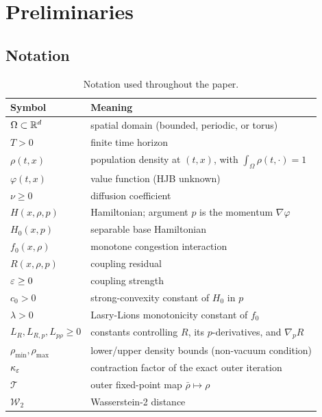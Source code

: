 \section{Preliminaries}
\label{sec:prelim}

\subsection{Notation}

\begin{table}[h]
\centering
\begin{tabular}{ll}
\toprule
Symbol & Meaning \\
\midrule
$\Omega \subset \mathbb{R}^d$ & spatial domain (bounded, periodic, or torus) \\
$T > 0$               & finite time horizon \\
$\rho(t,x)$           & population density at $(t,x)$, with $\int_\Omega \rho(t,\cdot) = 1$ \\
$\varphi(t,x)$        & value function (HJB unknown) \\
$\nu \geq 0$          & diffusion coefficient \\
$H(x,\rho,p)$         & Hamiltonian; argument $p$ is the momentum $\nabla\varphi$ \\
$H_0(x,p)$            & separable base Hamiltonian \\
$f_0(x,\rho)$         & monotone congestion interaction \\
$R(x,\rho,p)$         & coupling residual \\
$\varepsilon \geq 0$         & coupling strength \\
$c_0 > 0$             & strong-convexity constant of $H_0$ in $p$ \\
$\lambda > 0$         & Lasry-Lions monotonicity constant of $f_0$ \\
$L_R, L_{R,p}, L_{p\rho} \geq 0$ & constants controlling $R$, its $p$-derivatives, and $\nabla_p R$ \\
$\rho_{\min}, \rho_{\max}$ & lower/upper density bounds (non-vacuum condition) \\
$\kappa_\varepsilon$ & contraction factor of the exact outer iteration \\
$\mathcal{T}$         & outer fixed-point map  $\bar\rho \mapsto \rho$ \\
$\mathcal{W}_2$       & Wasserstein-2 distance \\
\bottomrule
\end{tabular}
\caption{Notation used throughout the paper.}
\label{tab:notation}
\end{table}

